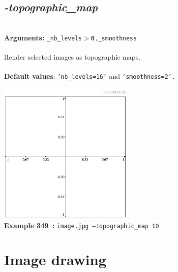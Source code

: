 \documentclass[a4paper,11pt,twoside]{book}
\begin{document}
\subsection{\emph{-topographic\_map} }\vspace*{-0.5em}
~\\\textbf{Arguments: } 
{\small \texttt{\_nb\_levels$>$0,\_smoothness}}\\~\\
Render selected images as topographic maps.
~\\~\\\textbf{Default values}: {\small \texttt{'nb\_levels=16'} and \texttt{'smoothness=2'.}}
\begin{center}\includegraphics[keepaspectratio=true,height=7cm,width=\textwidth]{img/gmic_def349.jpg}\\
{\footnotesize \textbf{Example 349~:} \texttt{image.jpg --topographic\_map 10}}
\end{center}
\section{Image drawing}
\end{document}
